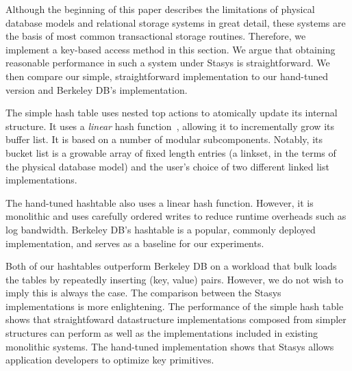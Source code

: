 \documentclass[letterpaper,twocolumn,10pt]{article}
\newcommand{\yad}{Stasys\xspace}
\begin{document}
Although the beginning of this paper describes the limitations of
physical database models and relational storage systems in great
detail, these systems are the basis of most common transactional
storage routines.  Therefore, we implement a key-based access 
method in this section. We argue that 
obtaining reasonable performance in such a system under \yad is
straightforward.  We then compare our simple, straightforward 
implementation to our hand-tuned version and Berkeley DB's implementation.

The simple hash table uses nested top actions to atomically update its
internal structure.  It uses a {\em linear} hash function~\cite{lht}, allowing
it to incrementally grow its buffer list.  It is based on a number of
modular subcomponents.  Notably, its bucket list is a growable array
of fixed length entries (a linkset, in the terms of the physical
database model) and the user's choice of two different linked list
implementations.

The hand-tuned hashtable also uses a linear hash
function.  However, it is monolithic and uses carefully ordered writes to
reduce runtime overheads such as log bandwidth.  Berkeley DB's
hashtable is a popular, commonly deployed implementation, and serves
as a baseline for our experiments.

Both of our hashtables outperform Berkeley DB on a workload that
bulk loads the tables by repeatedly inserting (key, value) pairs.  
However, we do not wish to imply this is always the case.
The comparison between the \yad  implementations is more
enlightening.  The performance of the simple hash table shows that
straightfoward datastructure implementations composed from
simpler structures can perform as well as the implementations included 
in existing monolithic systems.  The hand-tuned
implementation shows that \yad allows application developers to
optimize key primitives.


\end{document}
